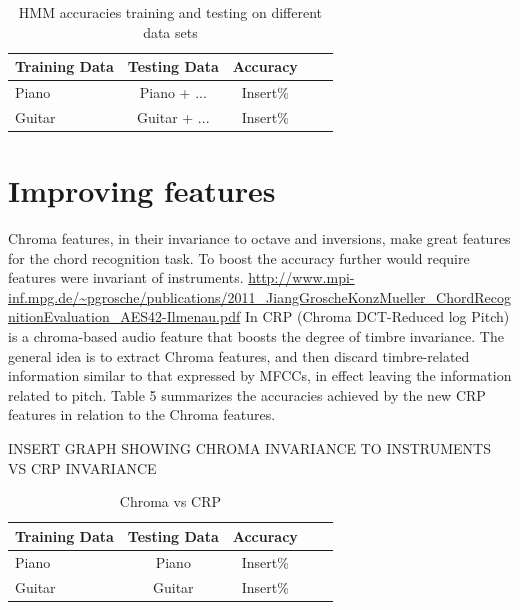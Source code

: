 \documentclass{article}
\begin{document}
\begin{table}[t]
\caption{HMM accuracies training and testing on different data sets}
\label{hmmacc}
\vskip 0.15in
\begin{center}
\begin{small}
\begin{sc}
\begin{tabular}{lcccr}
\hline
\abovespace\belowspace
Training Data & Testing Data & Accuracy \\
\hline
\abovespace
Piano  & Piano + ... & Insert\%\\
Guitar & Guitar + ... & Insert\%\\
\hline
\end{tabular}
\end{sc}
\end{small}
\end{center}
\vskip -0.1in
\end{table}

\section{Improving features}

Chroma features, in their invariance to octave and inversions, make great features for the chord recognition task. To boost the accuracy further would require features were invariant of instruments. \url{http://www.mpi-inf.mpg.de/~pgrosche/publications/2011_JiangGroscheKonzMueller_ChordRecognitionEvaluation_AES42-Ilmenau.pdf} In CRP (Chroma DCT-Reduced log Pitch) is a chroma-based audio feature that boosts the degree of timbre invariance. The general idea is to extract Chroma features, and then discard timbre-related information similar to that expressed by MFCCs, in effect leaving the information related to pitch. Table 5 summarizes the accuracies achieved by the new CRP features in relation to the Chroma features.

INSERT GRAPH SHOWING CHROMA INVARIANCE TO INSTRUMENTS VS CRP INVARIANCE

\begin{table}[t]
\caption{Chroma vs CRP}
\label{chromavscrp}
\vskip 0.15in
\begin{center}
\begin{small}
\begin{sc}
\begin{tabular}{lcccr}
\hline
\abovespace\belowspace
Training Data & Testing Data & Accuracy \\
\hline
\abovespace
Piano  & Piano  & Insert\%\\
Guitar & Guitar  & Insert\%\\
\hline
\end{tabular}
\end{sc}
\end{small}
\end{center}
\vskip -0.1in
\end{table}
\end{document}
